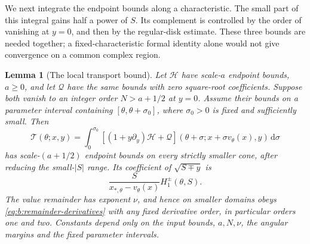 \documentclass[a4paper,10pt]{article}
\numberwithin{equation}{section}
\newcommand{\dd}{\mathrm{d}}
\theoremstyle{paperplain}
\newtheorem{lmm}[thm]{Lemma}
\theoremstyle{paperremark}
\theoremstyle{paperplain}
\begin{document}
We next integrate the endpoint bounds along a characteristic. The
small part of this integral gains half a power of $S$. Its complement
is controlled by the order of vanishing at $y=0$, and then by the
regular-disk estimate. These three bounds are needed together; a
fixed-characteristic formal identity alone would not give convergence
on a common complex region.

\begin{lmm}[The local transport bound]\label{lmm:b:local-transport}
Let $\mathcal H$ have scale-$a$ endpoint bounds, $a\geq0$, and
let $\mathcal Q$ have the same bounds with zero square-root
coefficients. Suppose both vanish to an integer order
$N>a+1/2$ at $y=0$. Assume their bounds on a parameter interval
containing $[\theta,\theta+\sigma_0]$, where $\sigma_0>0$ is fixed
and sufficiently small. Then
\begin{equation}\label{eq:b:local-transport}
 \mathcal T(\theta;x,y)
 =\int_0^{\sigma_0}
       [(1+y\partial_y)\mathcal H+\mathcal Q]
       (\theta+\sigma;x+\sigma v_\theta(x),y)\,\dd\sigma
\end{equation}
has scale-$(a+1/2)$ endpoint bounds on every strictly smaller cone,
after reducing the small-$|S|$ range. Its coefficient of
$\sqrt{S\mp y}$ is
\begin{equation}\label{eq:b:transport-endpoint-coefficient}
 \frac{S}{x_{*,\theta}-v_\theta(x)}H_1^\pm(\theta,S).
\end{equation}
The value remainder has exponent $\nu$, and hence on smaller
domains obeys \eqref{eq:b:remainder-derivatives} with any fixed
derivative order, in particular orders one and two. Constants depend
only on the input bounds, $a,N,\nu$, the angular margins and the
fixed parameter intervals.
\end{lmm}
\end{document}
